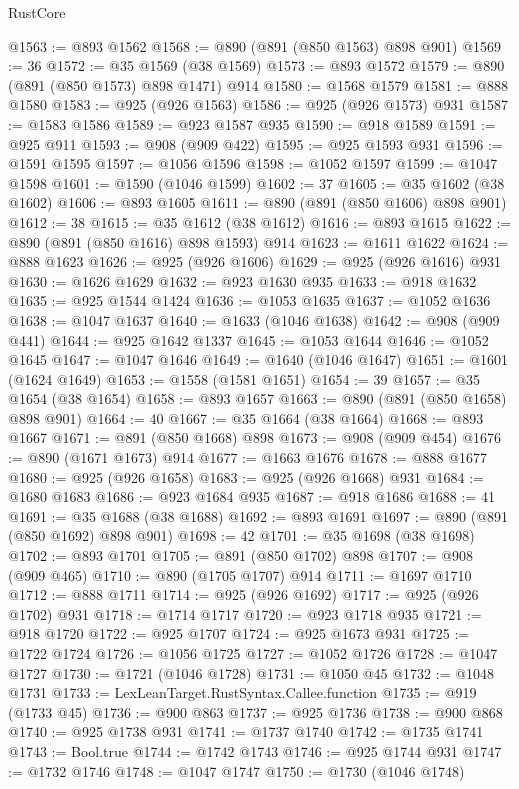 \begin{lexlean}{RustCore}
\begin{coremodule}
@1563 := @893 @1562
@1568 := @890 (@891 (@850 @1563) @898 @901)
@1569 := 36
@1572 := @35 @1569 (@38 @1569)
@1573 := @893 @1572
@1579 := @890 (@891 (@850 @1573) @898 @1471) @914
@1580 := @1568 @1579
@1581 := @888 @1580
@1583 := @925 (@926 @1563)
@1586 := @925 (@926 @1573) @931
@1587 := @1583 @1586
@1589 := @923 @1587 @935
@1590 := @918 @1589
@1591 := @925 @911
@1593 := @908 (@909 @422)
@1595 := @925 @1593 @931
@1596 := @1591 @1595
@1597 := @1056 @1596
@1598 := @1052 @1597
@1599 := @1047 @1598
@1601 := @1590 (@1046 @1599)
@1602 := 37
@1605 := @35 @1602 (@38 @1602)
@1606 := @893 @1605
@1611 := @890 (@891 (@850 @1606) @898 @901)
@1612 := 38
@1615 := @35 @1612 (@38 @1612)
@1616 := @893 @1615
@1622 := @890 (@891 (@850 @1616) @898 @1593) @914
@1623 := @1611 @1622
@1624 := @888 @1623
@1626 := @925 (@926 @1606)
@1629 := @925 (@926 @1616) @931
@1630 := @1626 @1629
@1632 := @923 @1630 @935
@1633 := @918 @1632
@1635 := @925 @1544 @1424
@1636 := @1053 @1635
@1637 := @1052 @1636
@1638 := @1047 @1637
@1640 := @1633 (@1046 @1638)
@1642 := @908 (@909 @441)
@1644 := @925 @1642 @1337
@1645 := @1053 @1644
@1646 := @1052 @1645
@1647 := @1047 @1646
@1649 := @1640 (@1046 @1647)
@1651 := @1601 (@1624 @1649)
@1653 := @1558 (@1581 @1651)
@1654 := 39
@1657 := @35 @1654 (@38 @1654)
@1658 := @893 @1657
@1663 := @890 (@891 (@850 @1658) @898 @901)
@1664 := 40
@1667 := @35 @1664 (@38 @1664)
@1668 := @893 @1667
@1671 := @891 (@850 @1668) @898
@1673 := @908 (@909 @454)
@1676 := @890 (@1671 @1673) @914
@1677 := @1663 @1676
@1678 := @888 @1677
@1680 := @925 (@926 @1658)
@1683 := @925 (@926 @1668) @931
@1684 := @1680 @1683
@1686 := @923 @1684 @935
@1687 := @918 @1686
@1688 := 41
@1691 := @35 @1688 (@38 @1688)
@1692 := @893 @1691
@1697 := @890 (@891 (@850 @1692) @898 @901)
@1698 := 42
@1701 := @35 @1698 (@38 @1698)
@1702 := @893 @1701
@1705 := @891 (@850 @1702) @898
@1707 := @908 (@909 @465)
@1710 := @890 (@1705 @1707) @914
@1711 := @1697 @1710
@1712 := @888 @1711
@1714 := @925 (@926 @1692)
@1717 := @925 (@926 @1702) @931
@1718 := @1714 @1717
@1720 := @923 @1718 @935
@1721 := @918 @1720
@1722 := @925 @1707
@1724 := @925 @1673 @931
@1725 := @1722 @1724
@1726 := @1056 @1725
@1727 := @1052 @1726
@1728 := @1047 @1727
@1730 := @1721 (@1046 @1728)
@1731 := @1050 @45
@1732 := @1048 @1731
@1733 := LexLeanTarget.RustSyntax.Callee.function
@1735 := @919 (@1733 @45)
@1736 := @900 @863
@1737 := @925 @1736
@1738 := @900 @868
@1740 := @925 @1738 @931
@1741 := @1737 @1740
@1742 := @1735 @1741
@1743 := Bool.true
@1744 := @1742 @1743
@1746 := @925 @1744 @931
@1747 := @1732 @1746
@1748 := @1047 @1747
@1750 := @1730 (@1046 @1748)

\end{coremodule}
\end{lexlean}
